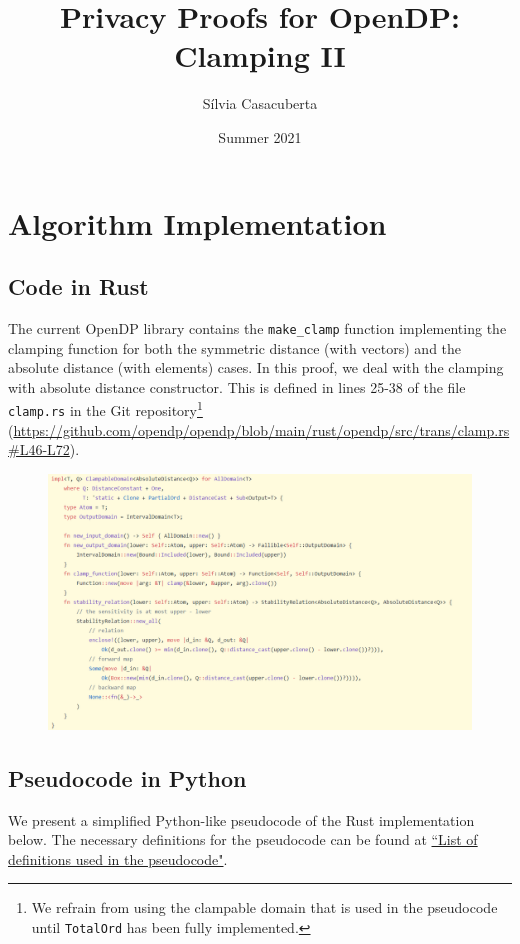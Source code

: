 \documentclass[11pt,a4paper]{article}
\title{Privacy Proofs for OpenDP: Clamping II}
\author{S\'ilvia Casacuberta}
\date{Summer 2021}
\theoremstyle{definition}
\begin{document}
\maketitle

\tableofcontents

\section{Algorithm Implementation}
\subsection{Code in Rust}
The current OpenDP library contains the \texttt{make\_clamp} function implementing the clamping function for both the symmetric distance (with vectors) and the absolute distance (with elements) cases. In this proof, we deal with the clamping with absolute distance constructor. This is defined in lines 25-38 of the file \texttt{clamp.rs} in the Git repository\footnote{We refrain from using the clampable domain that is used in the pseudocode until \texttt{TotalOrd} has been fully implemented.} (\url{https://github.com/opendp/opendp/blob/main/rust/opendp/src/trans/clamp.rs#L46-L72}).

\begin{figure}[ht]
    \includegraphics[width=15cm]{abs_clamp_rust.png}
    \centering
    \label{fig:code}
\end{figure}

\subsection{Pseudocode in Python}\label{sec:pseudocode}
We present a simplified Python-like pseudocode of the Rust implementation below. The necessary definitions for the pseudocode can be found at \href{https://www.overleaf.com/project/60d215bf90b337ac02200a99}{``List of definitions used in the pseudocode"}. 
\end{document}

